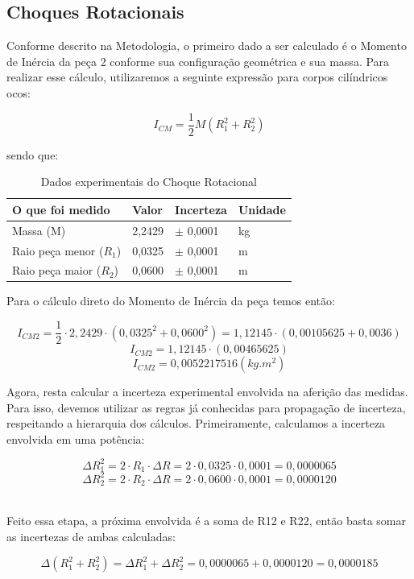\subsection{Choques Rotacionais}

Conforme descrito na Metodologia, o primeiro dado a ser calculado é o Momento de Inércia da peça 2 conforme sua configuração geométrica e sua massa. Para realizar esse cálculo, utilizaremos a seguinte expressão para corpos cilíndricos ocos:

\[I_{CM} = \frac {1}{2}M(R_1^2+R_2^2)\]

sendo que:\\

\begin{table}[H]
    \centering
    \begin{tabular}{ |M{4.3cm}||M{1.7cm}||M{2cm}||M{2cm}|  }
        \hline
        \textbf{O que foi medido} & \textbf{Valor} & \textbf{Incerteza} & \textbf{Unidade}\\
        \hline
        Massa (M)               & 2,2429    & $\pm$ 0,0001  & kg\\
        Raio peça menor ($R_1$) & 0,0325    & $\pm$ 0,0001  & m\\
        Raio peça maior ($R_2$) & 0,0600    & $\pm$ 0,0001  & m\\
        \hline
    \end{tabular}
    \caption{Dados experimentais do Choque Rotacional}
\end{table}

Para o cálculo direto do Momento de Inércia da peça temos então:

\[I_{CM2} = \frac{1}{2} \cdot 2,2429 \cdot (0,0325^2+0,0600^2) = 1,12145 \cdot (0,00105625 + 0,0036)\]
\[I_{CM2} = 1,12145 \cdot (0,00465625)\]
\[I_{CM2} = 0,0052217516 (kg.m^2)\]

Agora, resta calcular a incerteza experimental envolvida na aferição das medidas. Para isso, devemos utilizar as regras já conhecidas para propagação de incerteza, respeitando a hierarquia dos cálculos. Primeiramente, calculamos a incerteza envolvida em uma potência:

\[\Delta R_1^2 = 2 \cdot R_1 \cdot \Delta R = 2 \cdot 0,0325 \cdot 0,0001 = 0,0000065\]
\[\Delta R_2^2 = 2 \cdot R_2 \cdot \Delta R = 2 \cdot 0,0600 \cdot 0,0001 = 0,0000120\]\

Feito essa etapa, a próxima envolvida é a soma de R12 e R22, então basta somar as incertezas de ambas calculadas:

\[\Delta (R_1^2 + R_2^2) = \Delta R_1^2 + \Delta R_2^2 = 0,0000065 + 0,0000120 = 0,0000185\]\

